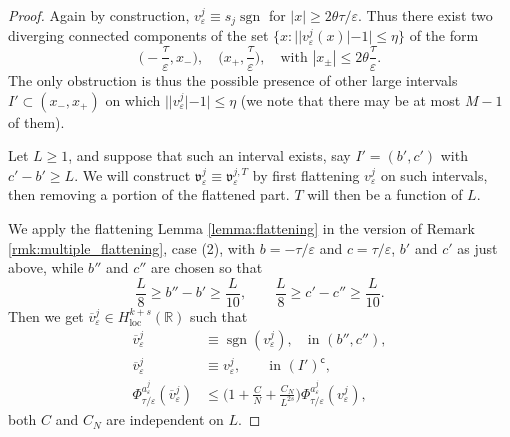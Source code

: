 \documentclass{article}
\theoremstyle{definition}
\newcommand{\R}{\mathbb{R}}
\newcommand{\e}{\varepsilon}
\def\e{\varepsilon}
\newcommand{\sgn}{\operatorname{sgn}}
\begin{document}
\begin{proof}
Again by construction, $v^j_\e\equiv s_j\sgn$ for $|x|\geq 2\theta\tau/\e$. Thus there exist two diverging connected components of the set $\{x\colon||v^j_\e(x)|-1|\leq \eta\}$ of the form 
\[\Big({-}\frac{\tau}{\e}, x_-\Big),\quad  \Big(x_+,\frac{\tau}{\e}\Big),\quad \text{with }|x_\pm|\leq 2\theta\frac{\tau}{\e}.\] 
The only obstruction is thus the possible presence of other large intervals $I'\subset (x_-,x_+)$ on which $||v^j_\e|-1|\leq \eta$ (we note that there may be at most $M-1$ of them).


Let $L\geq 1$, and suppose that such an interval exists, say $I'=(b',c')$ with $c'-b'\geq L$. We will construct $\mathfrak{v}^{j}_\e\equiv\mathfrak{v}^{j, T}_\e$ by first flattening $v^j_\e$ on such intervals, then removing a portion of the flattened part. $T$ will then be a function of $L$.

 We apply the flattening Lemma \ref{lemma:flattening} in the version of Remark \ref{rmk:multiple_flattening}, case (2), with 
    $b=-\tau/\e$ and $c= \tau/\e$,  $b'$ and $c'$ as just above, while $b''$ and $c''$ are chosen so that
    \begin{equation*}
    \frac{L}{8} \geq b''-b'\geq \frac{L}{10}, \qquad \frac{L}{8} \geq c'-c''\geq \frac{L}{10}.
\end{equation*}
Then we get $\overline{v}^{j}_\e \in H^{k+s}_{\mathrm{loc}}(\R)$ such that
    \begin{equation}
    \label{eq:tilde_v_properties}
        \begin{split}
       \overline{v}^{j}_\e&\equiv \sgn(v_\e^j),\quad \text{in } (b'',c''),\\
        \overline{v}^{j}_\e &\equiv v^j_\e,\qquad \text{in } (I')^{\mathsf c},\\
            \Phi^{a^{j}_{\scriptstyle\e}}_{\tau/ \e}(\overline{v}^{j}_\e) &\leq \Big(1+\frac{C}{N}+\frac{C_{N}}{L^{2s}}\Big)\Phi^{a^{j}_{\scriptstyle\e}}_{\tau/ \e}(v_\e^j),
        \end{split}
    \end{equation} 
    both $C$ and $C_N$ are independent on $L$. 
    

\end{proof}
\end{document}
